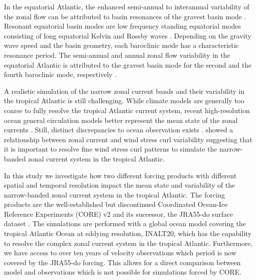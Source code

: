 \documentclass[os, manuscript]{copernicus}
\begin{document}
	
	In the equatorial Atlantic, the enhanced semi-annual to interannual variability of the zonal flow can be attributed to basin resonances of the gravest basin mode \citep{Thierry2004,Ascani2006,Orgeville2007,Ding2009,Greatbatch2012,Claus2016a,Brandt2016}. Resonant equatorial basin modes are low frequency standing equatorial modes consisting of long equatorial Kelvin and Rossby waves \citep{Cane1981}. Depending on the gravity wave speed and the basin geometry, each baroclinic mode has a characteristic resonance period. The semi-annual and annual zonal flow variability in the equatorial Atlantic is attributed to the gravest basin mode for the second and the fourth baroclinic mode, respectively \citep{Brandt2016}.
	
	A realistic simulation of the narrow zonal current bands and their variability in the tropical Atlantic is still challenging. While climate models are generally too coarse to fully resolve the tropical Atlantic current system, recent high-resolution ocean general circulation models better represent the mean state of the zonal currents \citep{Duteil2014a}. Still, distinct discrepancies to ocean observation exists \citep{Burmeister2020,Burmeister2019}. \cite{Burmeister2020} showed a relationship between zonal current and wind stress curl variability suggesting that it is important to resolve fine wind stress curl patterns to simulate the narrow-banded zonal current system in the tropical Atlantic. 
	
	In this study we investigate how two different forcing products with different spatial and temporal resolution impact the mean state and variability of the narrow-banded zonal current system in the tropical Atlantic. The forcing products are the well-established but discontinued Coordinated Ocean-Ice Reference Experiments (CORE) v2 \citep{Large2009} and its successor, the JRA55-do surface dataset \citep{Tsujino2018}. The simulations are performed with a global ocean model covering the tropical Atlantic Ocean at eddying resolution, INALT20, which has the capability to resolve the complex zonal current system in the tropical Atlantic. Furthermore, we have access to over ten years of velocity observations which period is now covered by the JRA55-do forcing. This allows for a direct comparison between model and observations which is not possible for simulations forced by CORE.
	
\end{document}
